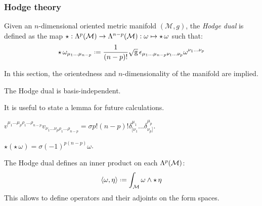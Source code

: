 \subsubsection{Hodge theory}

\begin{definition}
  Given an $ n $-dimensional oriented metric manifold $ (\mathcal{M},g) $, the \textit{Hodge dual} is defined as the map $ \star : \Lambda^{p}(\mathcal{M}) \rightarrow \Lambda^{n-p}(\mathcal{M}) : \omega \mapsto \star\, \omega $ such that:
  \begin{equation}
    \star\, \omega_{\mu_1 \dots \mu_{n-p}} \defeq \frac{1}{(n-p)!} \sqg\, \epsilon_{\mu_1 \dots \mu_{n-p} \nu_1 \dots \nu_p} \omega^{\nu_1 \dots \nu_p}
    \label{eq:3.17}
  \end{equation}
\end{definition}

In this section, the orientedness and $ n $-dimensionality of the manifold are implied.

\begin{proposition}
  The Hodge dual is basis-independent.
\end{proposition}

It is useful to state a lemma for future calculations.

\begin{lemma}
  $ v^{\mu_1 \dots \mu_p \rho_1 \dots \rho_{n-p}} v_{\nu_1 \dots \nu_p \rho_1 \dots \rho_{n-p}} = \sigma p! (n-p)! \delta^{\mu_1}_{[\nu_1} \dots \delta^{\mu_p}_{\nu_p]} $.
\end{lemma}

\begin{proposition}\label{hodge-hodge}
  $ \star \left( \star\, \omega \right) = \sigma \left( -1 \right)^{p (n-p)} \omega $.
\end{proposition}

The Hodge dual defines an inner product on each $ \Lambda^{p}(\mathcal{M}) $:
\begin{equation}
  \braket{\omega, \eta} \defeq \int_{\mathcal{M}} \omega \wedge \star\, \eta
  \label{eq:3.18}
\end{equation}
This allows to define operators and their adjoints on the form spaces.

